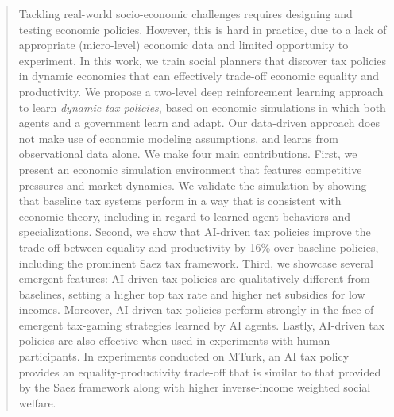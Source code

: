 \begin{abstract}
Tackling real-world socio-economic challenges requires designing and testing economic policies.
However, this is hard in practice, due to a lack of appropriate (micro-level) economic data and limited opportunity to experiment.
In this work, we train social planners that discover tax policies in dynamic economies that can effectively trade-off economic equality and productivity.
We propose a two-level deep reinforcement learning approach to learn \emph{dynamic tax policies}, based on economic simulations in which both agents and a government learn and adapt.
Our data-driven approach does not make use of economic modeling assumptions, and learns from observational data alone.
We make four main contributions.
First, we present an economic simulation environment that features competitive pressures and market dynamics.
We validate the simulation by showing that baseline tax systems perform in a way that is consistent with economic theory, including in regard to learned agent behaviors and specializations.
Second, we show that AI-driven tax policies improve the trade-off between equality and productivity by 16\% over baseline policies, including the prominent Saez tax framework.
Third, we showcase several emergent features: AI-driven tax policies are qualitatively different from baselines, setting a higher top tax rate and higher net subsidies for low incomes.
Moreover, AI-driven tax policies perform strongly in the face of emergent tax-gaming strategies learned by AI agents.
Lastly, AI-driven tax policies are also effective when used in experiments with human participants.
In experiments conducted on MTurk, an AI tax policy provides an equality-productivity trade-off that is similar to that provided by the Saez framework along with higher inverse-income weighted social welfare.
\end{abstract}